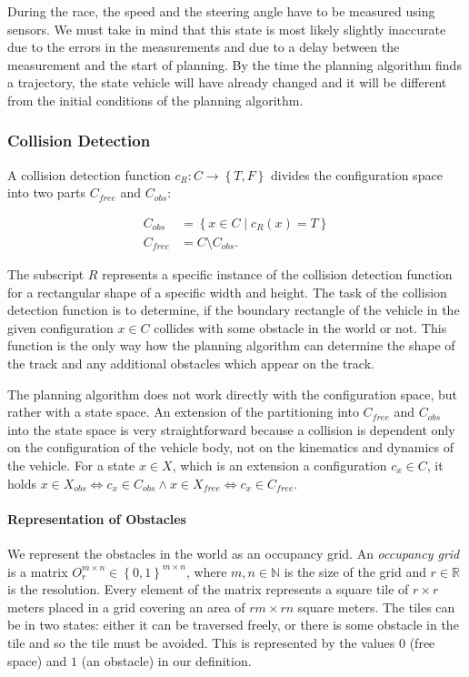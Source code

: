 During the race, the speed and the steering angle have to be measured using sensors. We must take in mind that this state is most likely slightly inaccurate due to the errors in the measurements and due to a delay between the measurement and the start of planning. By the time the planning algorithm finds a trajectory, the state vehicle will have already changed and it will be different from the initial conditions of the planning algorithm.

\subsubsection{Collision Detection}

A collision detection function $c_{R}: C \rightarrow \left\{T, F\right\}$ divides the configuration space into two parts $C_{free}$ and $C_{obs}$:

\begin{equation*}
\begin{aligned}
	C_{obs} &= \left\{x\in C \mid c_{R}(x)=T\right\} \\
	C_{free} &= C \setminus C_{obs}.
\end{aligned}
\end{equation*}

The subscript $R$ represents a specific instance of the collision detection function for a rectangular shape of a specific width and height. The task of the collision detection function is to determine, if the boundary rectangle of the vehicle in the given configuration $x\in C$ collides with some obstacle in the world or not. This function is the only way how the planning algorithm can determine the shape of the track and any additional obstacles which appear on the track.

The planning algorithm does not work directly with the configuration space, but rather with a state space. An extension of the partitioning into $C_{free}$ and $C_{obs}$ into the state space is very straightforward because a collision is dependent only on the configuration of the vehicle body, not on the kinematics and dynamics of the vehicle. For a state $x\in X$, which is an extension a configuration $c_x \in C$, it holds $x\in X_{obs} \iff c_x\in C_{obs} \wedge x\in X_{free} \iff c_x\in C_{free}$.

\paragraph{Representation of Obstacles}
We represent the obstacles in the world as an occupancy grid. An \textit{occupancy grid} is a matrix $O_r^{m\times n}\in \left\{0, 1\right\}^{m\times n}$, where $m,n\in\mathbb{N}$ is the size of the grid and $r\in\mathbb{R}$ is the resolution. Every element of the matrix represents a square tile of $r\times r$ meters placed in a grid covering an area of $rm\times rn$ square meters. The tiles can be in two states: either it can be traversed freely, or there is some obstacle in the tile and so the tile must be avoided. This is represented by the values $0$ (free space) and $1$ (an obstacle) in our definition.

